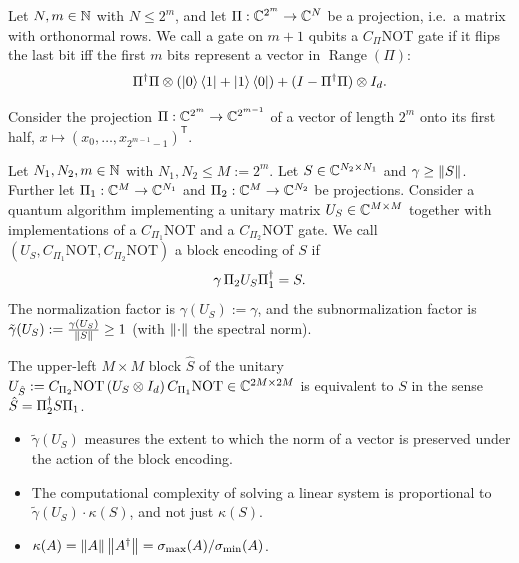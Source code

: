 \begin{definition}
Let $N, m \in \mathbb{N}$ with $N \le 2^m$, and let $\Pi : \mathbb{C}^{2^m} \to \mathbb{C}^N$ be a
projection, i.e.\ a matrix with orthonormal rows. We call a gate on $m + 1$
qubits a $C_\Pi$NOT gate if it flips the last bit iff the first $m$ bits represent
a vector in $\operatorname{Range}(\Pi)$:
\begin{equation}
  \Pi^{\dagger}\Pi \otimes (\ket{0}\bra{1} + \ket{1}\bra{0}) + (I - \Pi^{\dagger}\Pi) \otimes I_d.
\end{equation}
\end{definition}

\begin{example}
Consider the projection $\Pi : \mathbb{C}^{2^m} \to \mathbb{C}^{2^{m-1}}$ of a vector of length
$2^m$ onto its first half, $x \mapsto (x_0, \dots, x_{2^{m-1}-1})^{\mathsf{T}}$.
\end{example}

\begin{definition}
Let $N_1, N_2, m \in \mathbb{N}$ with $N_1, N_2 \le M := 2^m$. Let $S \in \mathbb{C}^{N_2 \times N_1}$
and $\gamma \ge \left\lVert S \right\rVert$. Further let $\Pi_1 : \mathbb{C}^M \to \mathbb{C}^{N_1}$ and
$\Pi_2 : \mathbb{C}^M \to \mathbb{C}^{N_2}$ be projections. Consider a quantum algorithm
implementing a unitary matrix $U_S \in \mathbb{C}^{M \times M}$ together with
implementations of a $C_{\Pi_1}$NOT and a $C_{\Pi_2}$NOT gate. We call
$(U_S, C_{\Pi_1}\mathrm{NOT}, C_{\Pi_2}\mathrm{NOT})$ a block encoding of $S$ if
\begin{equation}
  \gamma\,\Pi_2 U_S \Pi_1^{\dagger} = S.
\end{equation}
The normalization factor is $\gamma(U_S) := \gamma$, and the subnormalization
factor is $\tilde{\gamma}(U_S) := \tfrac{\gamma(U_S)}{\left\lVert S \right\rVert} \ge 1$ (with
$\left\lVert \cdot \right\rVert$ the spectral norm).
\end{definition}

\begin{remark}
The upper-left $M \times M$ block $\hat{S}$ of the unitary
$U_{\hat{S}} := C_{\Pi_2}\mathrm{NOT}\,(U_S \otimes I_d)\,C_{\Pi_1}\mathrm{NOT} \in \mathbb{C}^{2M \times 2M}$
is equivalent to $S$ in the sense $\hat{S} = \Pi_2^{\dagger} S \Pi_1$.
\begin{itemize}
  \item $\tilde{\gamma}(U_S)$ measures the extent to which the norm of a vector is
    preserved under the action of the block encoding.
  \item The computational complexity of solving a linear system is proportional to
    $\tilde{\gamma}(U_S)\cdot\kappa(S)$, and not just $\kappa(S)$.
  \item $\kappa(A) = \left\lVert A \right\rVert\left\lVert A^{\dagger} \right\rVert = \sigma_{\max}(A)/\sigma_{\min}(A)$.
\end{itemize}
\end{remark}

